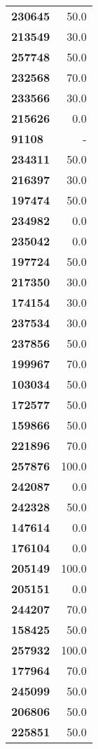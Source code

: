 \documentclass[11pt]{article}
\begin{document}
\begin{center}
\begin{longtable}{lr}
\bottomrule
\endlastfoot
\textbf{230645} &                  50.0 \\
\textbf{213549} &                  30.0 \\
\textbf{257748} &                  50.0 \\
\textbf{232568} &                  70.0 \\
\textbf{233566} &                  30.0 \\
\textbf{215626} &                   0.0 \\
\textbf{91108 } &                     - \\
\textbf{234311} &                  50.0 \\
\textbf{216397} &                  30.0 \\
\textbf{197474} &                  50.0 \\
\textbf{234982} &                   0.0 \\
\textbf{235042} &                   0.0 \\
\textbf{197724} &                  50.0 \\
\textbf{217350} &                  30.0 \\
\textbf{174154} &                  30.0 \\
\textbf{237534} &                  30.0 \\
\textbf{237856} &                  50.0 \\
\textbf{199967} &                  70.0 \\
\textbf{103034} &                  50.0 \\
\textbf{172577} &                  50.0 \\
\textbf{159866} &                  50.0 \\
\textbf{221896} &                  70.0 \\
\textbf{257876} &                 100.0 \\
\textbf{242087} &                   0.0 \\
\textbf{242328} &                  50.0 \\
\textbf{147614} &                   0.0 \\
\textbf{176104} &                   0.0 \\
\textbf{205149} &                 100.0 \\
\textbf{205151} &                   0.0 \\
\textbf{244207} &                  70.0 \\
\textbf{158425} &                  50.0 \\
\textbf{257932} &                 100.0 \\
\textbf{177964} &                  70.0 \\
\textbf{245099} &                  50.0 \\
\textbf{206806} &                  50.0 \\
\textbf{225851} &                  50.0 \\
\end{longtable}
\end{center}
\end{document}
